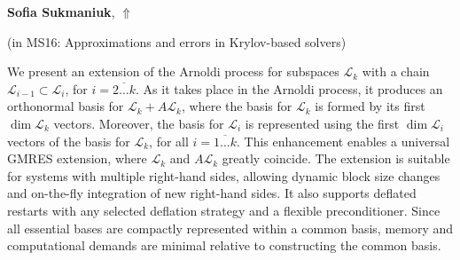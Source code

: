 \documentclass[ILAS2025-program.tex]{subfiles}
\begin{document}
\hypertarget{down0345}{}\begin{ilasabstract}
    
\textbf{Sofia Sukmaniuk},  \hfill \hyperlink{up0345}{$\Uparrow$}
    
    
(in {\color{mstitle}MS16: Approximations and errors in Krylov-based solvers})
        
\mtskip
    We present an extension of the Arnoldi process for subspaces \({\mathcal L}_k\) with a chain \({\mathcal L}_{i-1} \subset {\mathcal L}_i\), for \(i = \overline{2 \dots k}\). As it takes place in the Arnoldi process, it produces an orthonormal basis for \({\mathcal L}_k + A {\mathcal L}_k\), where the basis for \({\mathcal L}_k\) is formed by its first \(\dim {\mathcal L}_k\) vectors. Moreover, the basis for \({\mathcal L}_i\) is represented using the first \(\dim {\mathcal L}_i\) vectors of the basis for \({\mathcal L}_k\), for all \(i = \overline{1 \dots k}\). This enhancement enables a universal GMRES extension, where ${\mathcal L}_k$ and $A{\mathcal L}_k$ greatly coincide.  The extension is suitable for systems with multiple right-hand sides, allowing dynamic block size changes and on-the-fly integration of new right-hand sides. It also supports deflated restarts with any selected deflation strategy and a flexible preconditioner. Since all essential bases are compactly represented within a common basis, memory and computational demands are minimal relative to constructing the common basis.


 

\end{ilasabstract}
    
\end{document}
